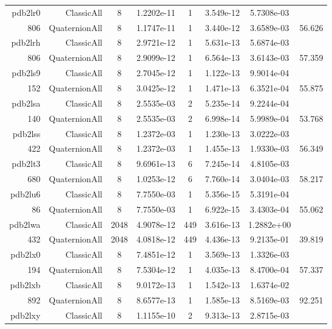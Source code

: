 \begin{xltabular}{\textwidth}{r|rcS[table-format=1.4e+2]cS[table-format=1.3e+2]S[table-format=1.4e+2]S[table-format=-1.3]}
pdb2lr0 & ClassicAll & 8 & 1.2202e-11 & 1 & 3.549e-12 & 5.7308e-03 & \\
806 & QuaternionAll & 8 & 1.1747e-11 & 1 & 3.440e-12 & 3.6589e-03 & 56.626\\  \addlinespace
pdb2lrh & ClassicAll & 8 & 2.9721e-12 & 1 & 5.631e-13 & 5.6874e-03 & \\
806 & QuaternionAll & 8 & 2.9099e-12 & 1 & 6.564e-13 & 3.6143e-03 & 57.359\\  \addlinespace
pdb2ls9 & ClassicAll & 8 & 2.7045e-12 & 1 & 1.122e-13 & 9.9014e-04 & \\
152 & QuaternionAll & 8 & 3.0425e-12 & 1 & 1.471e-13 & 6.3521e-04 & 55.875\\  \addlinespace
pdb2lsa & ClassicAll & 8 & 2.5535e-03 & 2 & 5.235e-14 & 9.2244e-04 & \\
140 & QuaternionAll & 8 & 2.5535e-03 & 2 & 6.998e-14 & 5.9989e-04 & 53.768\\  \addlinespace
pdb2lss & ClassicAll & 8 & 1.2372e-03 & 1 & 1.230e-13 & 3.0222e-03 & \\
422 & QuaternionAll & 8 & 1.2372e-03 & 1 & 1.455e-13 & 1.9330e-03 & 56.349\\  \addlinespace
pdb2lt3 & ClassicAll & 8 & 9.6961e-13 & 6 & 7.245e-14 & 4.8105e-03 & \\
680 & QuaternionAll & 8 & 1.0253e-12 & 6 & 7.760e-14 & 3.0404e-03 & 58.217\\  \addlinespace
pdb2lu6 & ClassicAll & 8 & 7.7550e-03 & 1 & 5.356e-15 & 5.3191e-04 & \\
86 & QuaternionAll & 8 & 7.7550e-03 & 1 & 6.922e-15 & 3.4303e-04 & 55.062\\  \addlinespace
pdb2lwa & ClassicAll & 2048 & 4.9078e-12 & 449 & 3.616e-13 & 1.2882e+00 & \\
432 & QuaternionAll & 2048 & 4.0818e-12 & 449 & 4.436e-13 & 9.2135e-01 & 39.819\\  \addlinespace
pdb2lx0 & ClassicAll & 8 & 7.4851e-12 & 1 & 3.569e-13 & 1.3326e-03 & \\
194 & QuaternionAll & 8 & 7.5304e-12 & 1 & 4.035e-13 & 8.4700e-04 & 57.337\\  \addlinespace
pdb2lxb & ClassicAll & 8 & 9.0172e-13 & 1 & 1.542e-13 & 1.6374e-02 & \\
892 & QuaternionAll & 8 & 8.6577e-13 & 1 & 1.585e-13 & 8.5169e-03 & 92.251\\  \addlinespace
pdb2lxy & ClassicAll & 8 & 1.1155e-10 & 2 & 9.313e-13 & 2.8715e-03 & \\

\end{xltabular}

